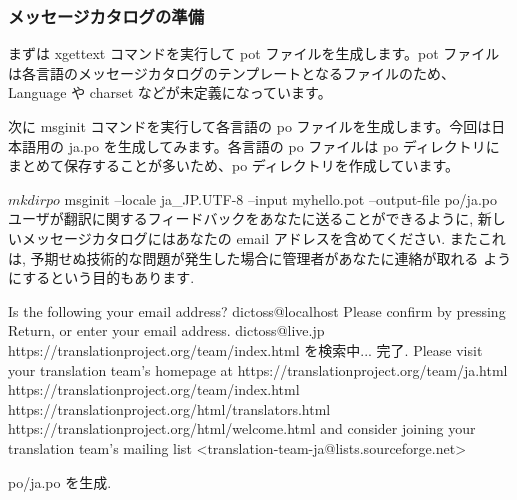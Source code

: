 \documentclass[mingoth,a4paper]{jsarticle}
\begin{document}
\subsubsection{メッセージカタログの準備}

まずは xgettext コマンドを実行して pot ファイルを生成します。pot ファイルは各言語のメッセージカタログのテンプレートとなるファイルのため、Language や charset などが未定義になっています。


次に msginit コマンドを実行して各言語の po ファイルを生成します。今回は日本語用の ja.po を生成してみます。各言語の po ファイルは po ディレクトリにまとめて保存することが多いため、po ディレクトリを作成しています。

\begin{commandline}
$ mkdir po
$ msginit --locale ja_JP.UTF-8 --input myhello.pot --output-file po/ja.po
ユーザが翻訳に関するフィードバックをあなたに送ることができるように,
新しいメッセージカタログにはあなたの email アドレスを含めてください.
またこれは, 予期せぬ技術的な問題が発生した場合に管理者があなたに連絡が取れる
ようにするという目的もあります.

Is the following your email address?
  dictoss@localhost
Please confirm by pressing Return, or enter your email address.
dictoss@live.jp
https://translationproject.org/team/index.html を検索中... 完了.
Please visit your translation team's homepage at
  https://translationproject.org/team/ja.html
  https://translationproject.org/team/index.html
  https://translationproject.org/html/translators.html
  https://translationproject.org/html/welcome.html
and consider joining your translation team's mailing list
  <translation-team-ja@lists.sourceforge.net>

po/ja.po を生成.
\end{commandline}
\end{document}
